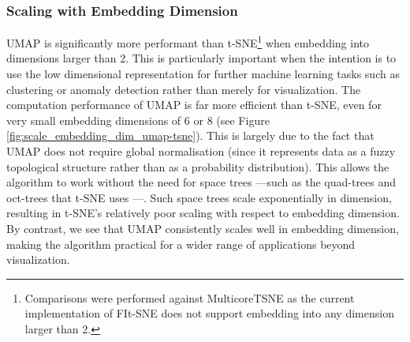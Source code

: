 \documentclass[12pt]{article}
\begin{document}
\subsubsection{Scaling with Embedding Dimension}\label{embed_dim_scaling}

UMAP is significantly more performant than t-SNE\footnote{Comparisons were performed against MulticoreTSNE as the current implementation of FIt-SNE does not support embedding into any dimension larger than 2.} when embedding into dimensions larger than 2. This is particularly important when the intention is to use the low dimensional representation for further machine learning tasks such as clustering or anomaly detection rather than merely for visualization. The computation performance of UMAP  is far more efficient than t-SNE, even for very small embedding dimensions of 6 or 8 (see Figure \ref{fig:scale_embedding_dim_umap-tsne}). This is largely due to the fact that UMAP does not require global normalisation (since it represents data as a fuzzy topological structure rather than as a probability distribution). This allows the algorithm to work without the need for space trees ---such as the quad-trees and oct-trees that t-SNE uses \cite{van2014accelerating}---. Such space trees scale exponentially in dimension, resulting in t-SNE's relatively poor scaling with respect to embedding dimension. By contrast, we see that UMAP consistently scales well in embedding dimension, making the algorithm practical for a wider range of applications beyond visualization.
\end{document}
